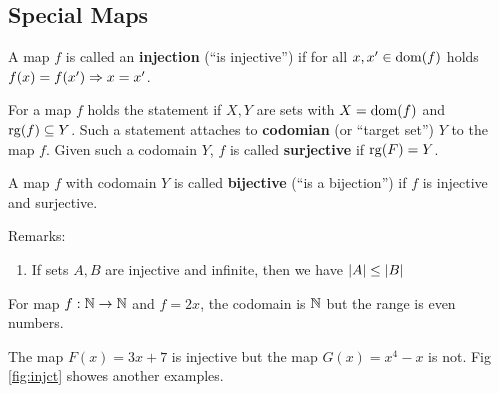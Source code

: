 \documentclass[12pt]{book}
\begin{document}
\subsection{Special Maps}
\label{sec:Specialmaps}

\begin{defi}\label{def:inj}
  A map $f$ is called an \textbf{injection} (``is injective'') if for all $x, x' \in \operatorname{dom}(f)$ holds $f(x) = f(x') \Rightarrow x = x'$.
\end{defi}

\begin{defi}\label{def:surj}
  For a map $f$ holds the statement  if $X, Y$ are sets with $X = \operatorname{dom}(f)$ and $\operatorname{rg}(f) \subseteq Y$. Such a statement attaches to \textbf{codomian} (or ``target set'') $Y$ to the map $f$. Given such a codomain $Y$, $f$ is called \textbf{surjective} if $\operatorname{rg}(F) = Y$.
\end{defi}

\begin{defi}\label{def:bij}
  A map $f$ with codomain $Y$ is called \textbf{bijective} (``is a bijection'') if $f$ is injective and surjective.
\end{defi}

Remarks:
\begin{enumerate}
\item If sets $A , B$ are injective and infinite, then we have $\lvert A \rvert \leq \lvert B \rvert$
\end{enumerate}

\begin{examp}\label{exp:Specialmaps}
For map $f: \mathbb{N} \to \mathbb{N}$ and $f=2x$, the codomain is $\mathbb{N}$ but the range is even numbers.
\end{examp}

\begin{examp}\label{exp:Specialmaps}
  The map $F(x) = 3 x + 7$ is injective but the map $G(x) = x^4 - x$ is not. Fig \ref{fig:injct} showes another examples.
\end{examp}
\end{document}
